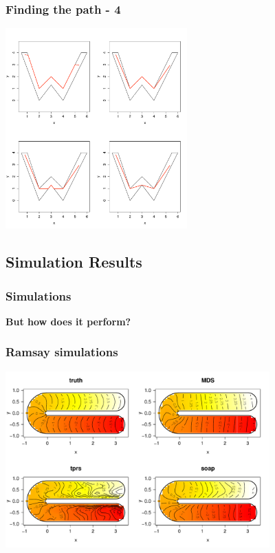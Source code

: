 \documentclass[ignorenonframetext]{beamer} %
\newcommand{\bc}{\begin{center}}
\newcommand{\ec}{\end{center}}
\begin{document}
\begin{frame}
	\frametitle{Finding the path - 4}
            \centering
              \includegraphics[width=2.75in]{figs/wood-4}\\
\end{frame}

\subsection{Simulation Results}

\begin{frame}
	\frametitle{Simulations}
	\bc \textbf{But how does it perform?}\ec
\end{frame}


\begin{frame}
	\frametitle{Ramsay simulations}
            \centering
              \includegraphics[width=4in]{figs/ramsay-low.pdf}\\
\end{frame}

\end{document}
